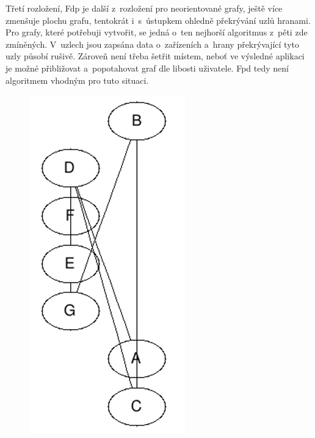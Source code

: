 \documentclass[color,table,oneside,nolot,nolof]{fithesis}
\begin{document}
	Třetí rozložení, \cite{graphviz_layout} 
	Fdp je další z~rozložení pro neorientované grafy, ještě více zmenšuje plochu grafu, tentokrát i~s~ústupkem ohledně překrývání
	uzlů hranami. Pro grafy, které potřebuji vytvořit, se jedná o~ten nejhorší algoritmus z~pěti zde zmíněných. V~uzlech jsou zapsána data o~zařízeních a~hrany překrývající tyto uzly
	působí rušivě. Zároveň není třeba šetřit místem, neboť ve výsledné aplikaci je možné přibližovat a~popotahovat graf dle libosti uživatele. Fpd tedy není algoritmem vhodným pro tuto
	situaci.
\begin{figure}
	\centering
	\includegraphics[width=0.6\textwidth]{pictures/fdp_example.png} 
\end{figure}
\end{document}

